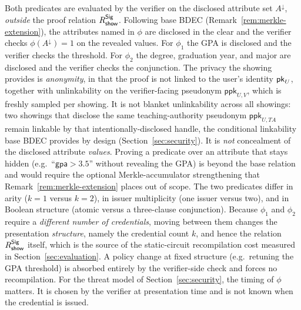 \begin{construction}
Both predicates are evaluated by the verifier on the disclosed attribute set $A^\downarrow$, \emph{outside} the proof relation $R_{\mathsf{show}}^{\mathsf{Sig}}$. Following base BDEC (Remark~\ref{rem:merkle-extension}), the attributes named in $\phi$ are disclosed in the clear and the verifier checks $\phi(A^\downarrow)=1$ on the revealed values. For $\phi_1$ the GPA is disclosed and the verifier checks the threshold. For $\phi_2$ the degree, graduation year, and major are disclosed and the verifier checks the conjunction. The privacy the showing provides is \emph{anonymity}, in that the proof is not linked to the user's identity $\mathsf{pk}_U$, together with unlinkability on the verifier-facing pseudonym $\mathsf{ppk}_{U,V}$, which is freshly sampled per showing. It is not blanket unlinkability across all showings: two showings that disclose the same teaching-authority pseudonym $\mathsf{ppk}_{U,TA}$ remain linkable by that intentionally-disclosed handle, the conditional linkability base BDEC provides by design (Section~\ref{sec:security}). It is \emph{not} concealment of the disclosed attribute \emph{values}. Proving a predicate over an attribute that stays hidden (e.g.\ ``$\mathsf{gpa}>3.5$'' without revealing the GPA) is beyond the base relation and would require the optional Merkle-accumulator strengthening that Remark~\ref{rem:merkle-extension} places out of scope. The two predicates differ in arity ($k=1$ versus $k=2$), in issuer multiplicity (one issuer versus two), and in Boolean structure (atomic versus a three-clause conjunction). Because $\phi_1$ and $\phi_2$ require a \emph{different number of credentials}, moving between them changes the presentation \emph{structure}, namely the credential count $k$, and hence the relation $R_{\mathsf{show}}^{\mathsf{Sig}}$ itself, which is the source of the static-circuit recompilation cost measured in Section~\ref{sec:evaluation}. A policy change at fixed structure (e.g.\ retuning the GPA threshold) is absorbed entirely by the verifier-side check and forces no recompilation. For the threat model of Section~\ref{sec:security}, the timing of $\phi$ matters. It is chosen by the verifier at presentation time and is not known when the credential is issued.


\end{construction}
